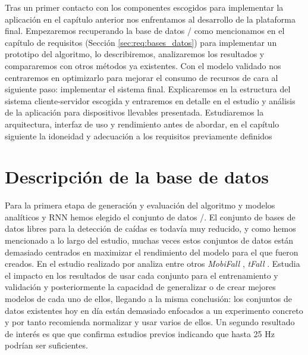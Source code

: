 
\begin{comment}
Aportar detalles del proceso de desarrollo incluyendo fases e hitos del proceso, diagramas representativos de la arquitectura y funcionamiento, capturas de pantalla para ilustrar el funcionamiento, etc.
\end{comment}

Tras un primer contacto con los componentes escogidos para implementar la aplicación en el capítulo anterior nos enfrentamos al desarrollo de la plataforma final. Empezaremos recuperando la base de datos \sisfall/  como mencionamos en el capítulo de requisitos (Sección \ref{sec:req:bases_datos}) para implementar un prototipo del algoritmo, lo describiremos, analizaremos los resultados y compararemos con otros métodos ya existentes. Con el modelo validado nos centraremos en optimizarlo para mejorar el consumo de recursos de cara al siguiente paso: implementar el sistema final. Explicaremos en la estructura del sistema cliente-servidor escogida y entraremos en detalle en el estudio y análisis de la aplicación para dispositivos llevables presentada. Estudiaremos la arquitectura, interfaz de uso y rendimiento antes de abordar, en el capítulo siguiente la idoneidad y adecuación a los requisitos previamente definidos 

\section{Descripción de la base de datos}

Para la primera etapa de generación y evaluación del algoritmo y modelos analíticos y RNN hemos elegido el conjunto de datos \sisfall/. El conjunto de bases de datos libres para la detección de caídas es todavía muy reducido, y como hemos mencionado a lo largo del estudio, muchas veces estos conjuntos de datos están demasiado centrados en maximizar el rendimiento del modelo para el que fueron creados. En el estudio realizado por  analiza entre otros \textit{MobiFall} \cite{MobiFall}, \textit{tFall} \cite{tfall}. Estudia el impacto en los resultados de usar cada conjunto para el entrenamiento y validación y posteriormente la capacidad de generalizar o de crear mejores modelos de cada uno de ellos, llegando a la misma conclusión: los conjuntos de datos existentes hoy en día están demasiado enfocados a un experimento concreto y por tanto recomienda normalizar y usar varios de ellos. Un segundo resultado de interés es que  que confirma estudios previos indicando que hasta 25 Hz podrían ser suficientes.


